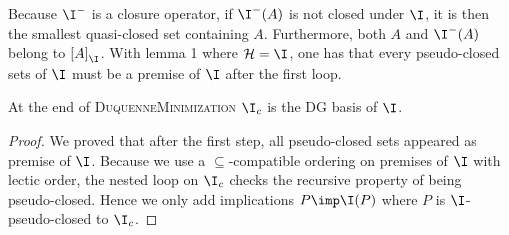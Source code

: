 Because $\I^{-}$ is a closure operator, if $\I^{-}(A)$ is not closed under $\I$,
it is then the smallest quasi-closed set containing $A$. Furthermore, both $A$
and $\I^{-}(A)$ belong to $\left[ A \right]_{\I}$. With lemma 1 where $\mathcal{H} = \I$, one has that every pseudo-closed sets of $\I$ must be a premise of $\I$ after the first loop.

\begin{proposition} At the end of \textsc{DuquenneMinimization} $\I_c$ is the
DG basis of $\I$.
\end{proposition}

\begin{proof} We proved that after the first step, all pseudo-closed sets
	appeared as premise of $\I$. Because we use a $\subseteq$-compatible ordering on premises of $\I$ with lectic order, the nested loop on $\I_c$
	checks the recursive property of being pseudo-closed. Hence we only add
	implications $P \imp \I(P)$ where $P$ is $\I$-pseudo-closed to $\I_c$.
\end{proof}

